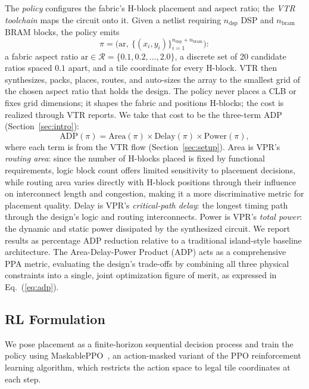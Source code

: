 \documentclass[sigconf]{acmart}
\begin{document}
The \emph{policy} configures the fabric's H-block placement and aspect
ratio; the \emph{VTR toolchain} maps the circuit onto it. Given a netlist requiring
$n_{\mathrm{dsp}}$ DSP and $n_{\mathrm{bram}}$ BRAM blocks, the policy emits
\begin{equation}
\label{eq:policy}
  \pi = \Big(\mathrm{ar},\ \{(x_i,y_i)\}_{i=1}^{n_{\mathrm{dsp}}+n_{\mathrm{bram}}}\Big):
\end{equation}
a fabric aspect ratio $\mathrm{ar} \in \mathcal{R} = \{0.1, 0.2, \ldots, 2.0\}$,
a discrete set of 20 candidate ratios spaced $0.1$ apart, and a tile
coordinate for every H-block. VTR then synthesizes, packs, places, routes, and auto-sizes
the array to the smallest grid of the chosen aspect ratio that holds the design.
The policy never places a CLB or fixes grid dimensions; it shapes the fabric
and positions H-blocks; the cost is realized through VTR reports.
We take that cost to be the three-term ADP (Section~\ref{sec:intro}):
\begin{equation}
\label{eq:adp}
  \mathrm{ADP}(\pi) = \mathrm{Area}(\pi) \times \mathrm{Delay}(\pi) \times \mathrm{Power}(\pi),
\end{equation}
where each term is from the VTR flow (Section~\ref{sec:setup}). Area is
VPR's \emph{routing area}: since the number of H-blocks placed is fixed
by functional requirements, logic block count offers limited sensitivity to
placement decisions, while routing area varies directly with H-block
positions through their influence on interconnect length and congestion,
making it a more discriminative metric for placement quality. Delay is
VPR's \emph{critical-path delay}: the longest timing path through the design's logic and routing interconnects. Power is VPR's \emph{total power}:
the dynamic and static power dissipated by the synthesized circuit. We
report results as percentage ADP reduction relative to a traditional
island-style baseline architecture. The Area-Delay-Power Product (ADP) acts as a comprehensive PPA metric, evaluating the design's trade-offs by combining all three physical constraints into a single, joint optimization figure of merit, as expressed in Eq.~(\ref{eq:adp}).

\subsection{RL Formulation}
\label{sec:rl}

We pose placement as a finite-horizon sequential decision process and train
the policy using MaskablePPO~\cite{maskableppo}, an action-masked variant of
the PPO reinforcement learning algorithm, which restricts the action space to
legal tile coordinates at each step.
\end{document}
